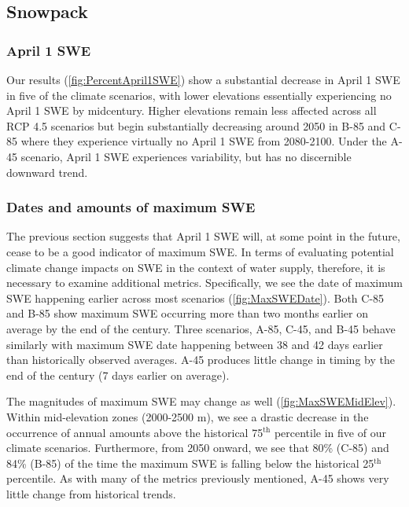 \documentclass[11pt,letterpaper]{article}
\begin{document}
\subsection{Snowpack}

\subsubsection{April 1 SWE}

Our results (\cref{fig:PercentApril1SWE}) show a substantial decrease in April 1 SWE in five of the climate scenarios, with lower elevations essentially experiencing no April 1 SWE by midcentury. Higher elevations remain less affected across all RCP 4.5 scenarios but begin substantially decreasing around 2050 in B-85 and C-85 where they experience virtually no April 1 SWE from 2080-2100. Under the A-45 scenario, April 1 SWE experiences variability, but has no discernible downward trend. 

\subsubsection{Dates and amounts of maximum SWE}

The previous section suggests that April 1 SWE will, at some point in the future, cease to be a good indicator of maximum SWE. In terms of evaluating potential climate change impacts on SWE in the context of water supply, therefore, it is necessary to examine additional metrics. Specifically, we see the date of maximum SWE happening earlier across most scenarios (\cref{fig:MaxSWEDate}). Both C-85 and B-85 show maximum SWE occurring more than two months earlier on average by the end of the century. Three scenarios, A-85, C-45, and B-45 behave similarly with maximum SWE date happening between 38 and 42 days earlier than historically observed averages. A-45 produces little change in timing by the end of the century (7 days earlier on average). 

The magnitudes of maximum SWE may change as well (\cref{fig:MaxSWEMidElev}). Within mid-elevation zones (2000-2500 m), we see a drastic decrease in the occurrence of annual amounts above the historical 75${}^\textrm{th}$ percentile in five of our climate scenarios. Furthermore, from 2050 onward, we see that 80\% (C-85) and 84\% (B-85) of the time the maximum SWE is falling below the historical 25${}^\textrm{th}$ percentile. As with many of the metrics previously mentioned, A-45 shows very little change from historical trends.
\end{document}
